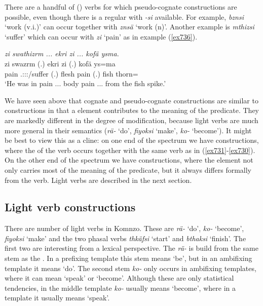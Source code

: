 There are a handful of () verbs for which pseudo-cognate constructions are possible, even though there is a regular  with \emph{-si} available. For example, \emph{bznsi} `work (v.i.)' can occur together with \emph{znsä} `work (n)'. Another example is \emph{mthizsi} `suffer' which can occur with \emph{zi} `pain' as in example (\ref{ex736}).

\begin{exe}
	\ex \emph{zi swathizrm ... ekri zi ... kofä ysma.}\\
	\gll zi swazrm (.) ekri zi (.) kofä ys=ma\\
	pain \Tsg.\Masc:\Sbj:\Pst:\Dur/suffer (.) flesh pain (.) fish thorn=\Char\\
	\trans `He was in pain ... body pain ... from the fish spike.'
	\label{ex736}
\end{exe}

We have seen above that cognate and pseudo-cognate constructions are similar to  constructions in that a  element contributes to the meaning of the predicate. They are markedly different in the degree of modification, because light verbs are much more general in their semantics (\emph{rä-} `do', \emph{fiyoksi} `make', \emph{ko-} `become'). It might be best to view this as a cline: on one end of the spectrum we have  constructions, where the  of the verb occurs together with the same verb as in (\ref{ex731}-\ref{ex730}). On the other end of the spectrum we have  constructions, where the  element not only carries most of the meaning of the predicate, but it always differs formally from the verb. Light verbs are described in the next section.

\subsection{Light verb constructions}\label{lightverb}

There are number of light verbs in Komnzo. These are \emph{rä-} `do', \emph{ko-} `become', \emph{fiyoksi} `make' and the two phasal verbs \emph{thkäfsi} `start' and \emph{bthaksi} `finish'. The first two are interesting from a lexical perspective. The  \emph{rä-} is build from the same stem as the . In a prefixing template this stem means `be', but in an ambifixing template it means `do'. The second stem \emph{ko-} only occurs in ambifixing templates, where it can mean `speak' or `become'. Although these are only statistical tendencies, in the middle template \emph{ko-} usually means `become', where in a  template it usually means `speak'.%

